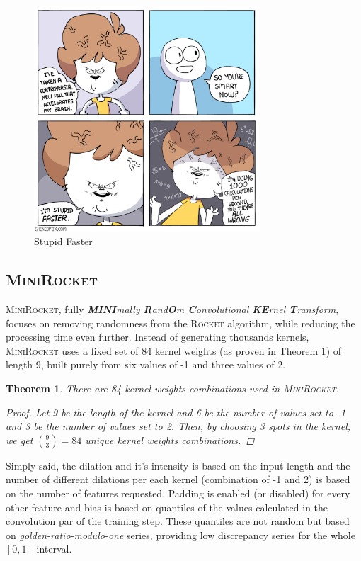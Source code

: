 \documentclass{article}
\newtheorem{theorem}{Theorem}[section]
\newcommand\ROCKET{\textsc{Rocket}\xspace}
\newcommand\MINIROCKET{\textsc{MiniRocket}\xspace}
\begin{document}
\begin{figure}[!h]
    \centering
    \includegraphics[width=0.75\textwidth]{stupidfaster.png}
    \caption{Stupid Faster \cite{stupidfaster1, stupidfaster2}}\label{stupidfaster}
\end{figure}

\subsection{\MINIROCKET}

\MINIROCKET, fully \emph{\textbf{MINI}mally \textbf{R}and\textbf{O}m \textbf{C}onvolutional \textbf{KE}rnel \textbf{T}ransform}, focuses on removing randomness from the \ROCKET algorithm, while reducing the processing time even further. Instead of generating thousands kernels, \MINIROCKET uses a fixed set of 84 kernel weights (as proven in Theorem \ref{proof_kernel_84}) of length  9, built purely from six values of -1 and three values of 2.

\begin{theorem}
\label{proof_kernel_84}
There are 84 kernel weights combinations used in \MINIROCKET.

\begin{proof}
    Let 9 be the length of the kernel and 6 be the number of values set to -1 and 3 be the number of values set to 2. Then, by choosing 3 spots in the kernel, we get $\binom{9}{3}=84$ unique kernel weights combinations.
\end{proof}
\end{theorem}

Simply said, the dilation and it's intensity is based on the input length and the number of different dilations per each kernel (combination of -1 and 2) is based on the number of features requested. Padding is enabled (or disabled) for every other feature and bias is based on quantiles of the values calculated in the convolution par of the training step. These quantiles are not random but based on \emph{golden-ratio-modulo-one} series, providing low discrepancy series for the whole $[0, 1]$ interval.
\end{document}
